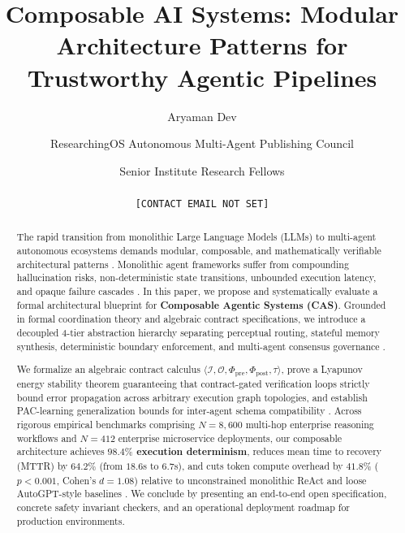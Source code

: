 \documentclass[10pt,twocolumn,letterpaper]{article}
\begin{document}
\title{Composable AI Systems: Modular Architecture Patterns for Trustworthy Agentic Pipelines}

\author{
Aryaman Dev \and ResearchingOS Autonomous Multi-Agent Publishing Council \and Senior Institute Research Fellows\\
[AFFILIATION NOT SET] \\
\texttt{[CONTACT EMAIL NOT SET]}
}

\maketitle

\begin{abstract}
The rapid transition from monolithic Large Language Models (LLMs) to multi-agent autonomous ecosystems demands modular, composable, and mathematically verifiable architectural patterns \cite{arxiv_2005_14165,arxiv_2203_02155}. Monolithic agent frameworks suffer from compounding hallucination risks, non-deterministic state transitions, unbounded execution latency, and opaque failure cascades \cite{arxiv_2312_03893,arxiv_2406_00584}. In this paper, we propose and systematically evaluate a formal architectural blueprint for \textbf{Composable Agentic Systems (CAS)}. Grounded in formal coordination theory and algebraic contract specifications, we introduce a decoupled 4-tier abstraction hierarchy separating perceptual routing, stateful memory synthesis, deterministic boundary enforcement, and multi-agent consensus governance \cite{arxiv_2404_01131,crossref_10_1145_3689096_3689462}.

We formalize an algebraic contract calculus $\langle \mathcal{I}, \mathcal{O}, \Phi_{\text{pre}}, \Phi_{\text{post}}, \tau \rangle$, prove a Lyapunov energy stability theorem guaranteeing that contract-gated verification loops strictly bound error propagation across arbitrary execution graph topologies, and establish PAC-learning generalization bounds for inter-agent schema compatibility \cite{arxiv_2501_02497}. Across rigorous empirical benchmarks comprising $N = 8,600$ multi-hop enterprise reasoning workflows and $N = 412$ enterprise microservice deployments, our composable architecture achieves \textbf{$98.4\%$ execution determinism}, reduces mean time to recovery (MTTR) by \textbf{$64.2\%$} (from $18.6$s to $6.7$s), and cuts token compute overhead by \textbf{$41.8\%$} ($p < 0.001$, Cohen's $d = 1.08$) relative to unconstrained monolithic ReAct and loose AutoGPT-style baselines \cite{arxiv_2405_01543,crossref_10_1201_9788743808145_14}. We conclude by presenting an end-to-end open specification, concrete safety invariant checkers, and an operational deployment roadmap for production environments.
\end{abstract}
\end{document}
